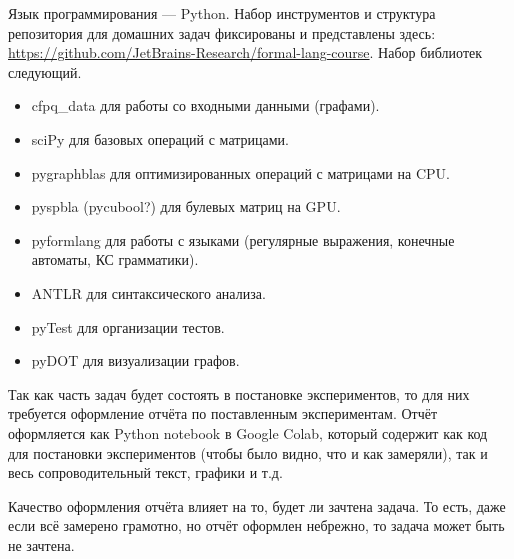 Язык программирования --- Python. Набор инструментов и структура репозитория для домашних задач фиксированы и представлены здесь: \url{https://github.com/JetBrains-Research/formal-lang-course}.
Набор библиотек следующий.
\begin{itemize}
    \item cfpq\_data для работы со входными данными (графами).
    \item sciPy для базовых операций с матрицами.
    \item pygraphblas для оптимизированных операций с матрицами на CPU.
    \item pyspbla (pycubool?) для булевых матриц на GPU.
    \item pyformlang для работы с языками (регулярные выражения, конечные автоматы, КС грамматики).
    \item ANTLR для синтаксического анализа.
    \item pyTest для организации тестов.
    \item pyDOT для визуализации графов.
\end{itemize}

Так как часть задач будет состоять в постановке экспериментов, то для них требуется оформление отчёта по поставленным экспериментам.
Отчёт оформляется как Python notebook в Google Colab, который содержит как код для постановки экспериментов (чтобы было видно, что и как замеряли), так и весь сопроводительный текст, графики и т.д.

Качество оформления отчёта влияет на то, будет ли зачтена задача. То есть, даже если всё замерено грамотно, но отчёт оформлен небрежно, то задача может быть не зачтена.

